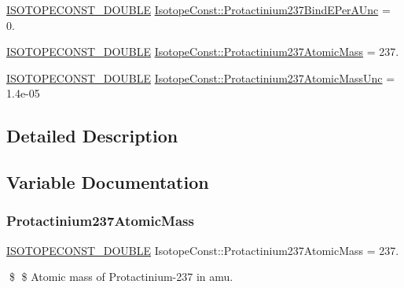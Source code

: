\begin{DoxyCompactItemize}
\item 
\mbox{\hyperlink{group___isotope_const-_macros_ga8f45a7272ce02c0b4c65c44636ed719a}{I\+S\+O\+T\+O\+P\+E\+C\+O\+N\+S\+T\+\_\+\+D\+O\+U\+B\+LE}} \mbox{\hyperlink{group___isotope_const-_protactinium-_pa237_gaffad63daaf5d28bf0869fcb511ea54ff}{Isotope\+Const\+::\+Protactinium237\+Bind\+E\+Per\+A\+Unc}} = 0.
\item 
\mbox{\hyperlink{group___isotope_const-_macros_ga8f45a7272ce02c0b4c65c44636ed719a}{I\+S\+O\+T\+O\+P\+E\+C\+O\+N\+S\+T\+\_\+\+D\+O\+U\+B\+LE}} \mbox{\hyperlink{group___isotope_const-_protactinium-_pa237_gabec1623184e9bcdc39f6edc3d6d76140}{Isotope\+Const\+::\+Protactinium237\+Atomic\+Mass}} = 237.
\item 
\mbox{\hyperlink{group___isotope_const-_macros_ga8f45a7272ce02c0b4c65c44636ed719a}{I\+S\+O\+T\+O\+P\+E\+C\+O\+N\+S\+T\+\_\+\+D\+O\+U\+B\+LE}} \mbox{\hyperlink{group___isotope_const-_protactinium-_pa237_gab522b1382c9a3905ba04b102af348316}{Isotope\+Const\+::\+Protactinium237\+Atomic\+Mass\+Unc}} = 1.\+4e-\/05
\end{DoxyCompactItemize}


\subsection{Detailed Description}


\subsection{Variable Documentation}
\mbox{\label{group___isotope_const-_protactinium-_pa237_gabec1623184e9bcdc39f6edc3d6d76140}} 
\subsubsection{\texorpdfstring{Protactinium237\+Atomic\+Mass}{Protactinium237AtomicMass}}
{\footnotesize\ttfamily \mbox{\hyperlink{group___isotope_const-_macros_ga8f45a7272ce02c0b4c65c44636ed719a}{I\+S\+O\+T\+O\+P\+E\+C\+O\+N\+S\+T\+\_\+\+D\+O\+U\+B\+LE}} Isotope\+Const\+::\+Protactinium237\+Atomic\+Mass = 237.}

\$ \$ Atomic mass of Protactinium-\/237 in amu. \mbox{\label{group___isotope_const-_protactinium-_pa237_gab522b1382c9a3905ba04b102af348316}} 

